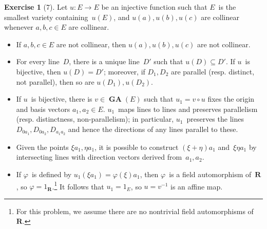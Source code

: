 \documentclass[letterpaper,12pt]{article}
\newcommand{\R}{\mathbf{R}}
\newcommand{\after}{\circ}
\DeclareMathOperator{\GA}{\mathbf{GA}}
\newcommand{\inv}[1]{#1^{-1}}
\theoremstyle{definition}
\newtheorem*{exer}{Exercise}
\theoremstyle{remark}
\begin{document}
\begin{exer}[7]
Let \(u:E\to E\) be an injective function such that \(E\)~is the smallest variety containing~\(u(E)\), and \(u(a),u(b),u(c)\) are collinear whenever \(a,b,c\in E\) are collinear.
\begin{itemize}[itemsep=0pt]
\item If \(a,b,c\in E\) are not collinear, then \(u(a),u(b),u(c)\) are not collinear.
\item For every line~\(D\), there is a unique line~\(D'\) such that \(u(D)\subseteq D'\). If \(u\)~is bijective, then \(u(D)=D'\); moreover, if \(D_1,D_2\) are parallel (resp. distinct, not parallel), then so are \(u(D_1),u(D_2)\).
\item If \(u\)~is bijective, there is \(v\in\GA(E)\) such that \(u_1=v\after u\) fixes the origin and basis vectors \(a_1,a_2\in E\). \(u_1\)~maps lines to lines and preserves parallelism (resp. distinctness, non-parallelism); in particular, \(u_1\)~preserves the lines \(D_{0a_1},D_{0a_2},D_{a_1a_2}\) and hence the directions of any lines parallel to these.
\item Given the points \(\xi a_1,\eta a_1\), it is possible to construct \((\xi+\eta)a_1\) and~\(\xi\eta a_1\) by intersecting lines with direction vectors derived from~\(a_1,a_2\).
\item If \(\varphi\)~is defined by \(u_1(\xi a_1)=\varphi(\xi) a_1\), then \(\varphi\)~is a field automorphism of~\(\R\), so \(\varphi=1_{\R}\).\footnote{For this problem, we assume there are no nontrivial field automorphisms of~\(\R\).} It follows that \(u_1=1_E\), so \(u=\inv{v}\) is an affine map.
\end{itemize}
\end{exer}
\end{document}
